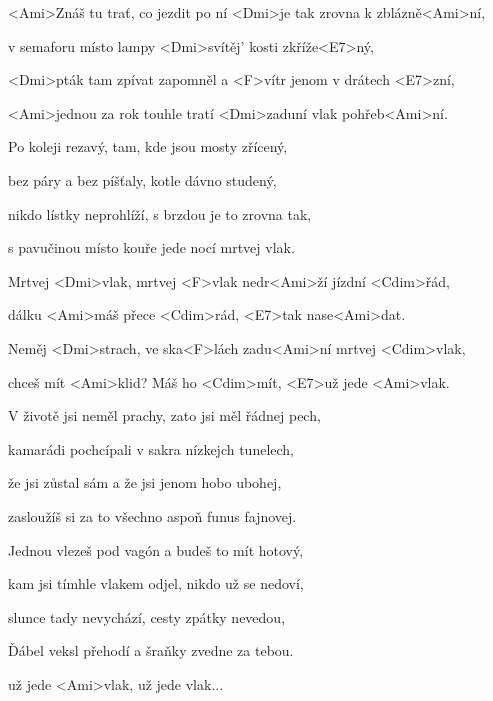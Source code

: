 

\zs
<Ami>Znáš tu trať, co jezdit po ní <Dmi>je tak zrovna k zblázně<Ami>ní,

v semaforu místo lampy <Dmi>svítěj' kosti zkříže<E7>ný,

<Dmi>pták tam zpívat zapomněl a <F>vítr jenom v drátech <E7>zní,

<Ami>jednou za rok touhle tratí <Dmi>zaduní vlak pohřeb<Ami>ní.
\ks

\zs
Po koleji rezavý, tam, kde jsou mosty zřícený,

bez páry a bez píšťaly, kotle dávno studený,

nikdo lístky neprohlíží, s brzdou je to zrovna tak,

s pavučinou místo kouře jede nocí mrtvej vlak.
\ks

\zr
Mrtvej <Dmi>vlak, mrtvej <F>vlak nedr<Ami>ží jízdní <Cdim>řád,

dálku <Ami>máš přece <Cdim>rád, <E7>tak nase<Ami>dat.

Neměj <Dmi>strach, ve ska<F>lách zadu<Ami>ní mrtvej <Cdim>vlak,

chceš mít <Ami>klid? Máš ho <Cdim>mít, <E7>už jede <Ami>vlak.
\kr

\zs
V životě jsi neměl prachy, zato jsi měl řádnej pech,

kamarádi pochcípali v sakra nízkejch tunelech,

že jsi zůstal sám a že jsi jenom hobo ubohej,

zasloužíš si za to všechno aspoň funus fajnovej.
\ks

\zs
Jednou vlezeš pod vagón a budeš to mít hotový,

kam jsi tímhle vlakem odjel, nikdo už se nedoví,

slunce tady nevychází, cesty zpátky nevedou,

Ďábel veksl přehodí a šraňky zvedne za tebou.
\ks

\zr\kr

už jede <Ami>vlak, už jede vlak...


\kp
